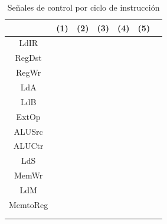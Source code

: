 \documentclass[letterpaper,11pt,notitlepage]{article}
\begin{document}
\begin{table}[H]
\begin{center}
\begin{tabular}{|c|c|c|c|c|c|c|} \hline
        &(1)&(2)&(3)&(4)&(5) \\ \hline
LdIR    &  &  &  &  &    \\ \hline
RegDst  &  &  &  &  &    \\ \hline
RegWr   &  &  &  &  &    \\ \hline
LdA     &  &  &  &  &    \\ \hline
LdB     &  &  &  &  &    \\ \hline
ExtOp   &  &  &  &  &    \\ \hline
ALUSrc  &  &  &  &  &    \\ \hline
ALUCtr  &  &  &  &  &    \\ \hline
LdS     &  &  &  &  &    \\ \hline
MemWr   &  &  &  &  &    \\ \hline
LdM     &  &  &  &  &    \\ \hline
MemtoReg&  &  &  &  &    \\ \hline
    &  &  &  &  &    \\ \hline
    &  &  &  &  &    \\ \hline

\end{tabular}
\end{center}
\caption{Señales de control por ciclo de instrucción}
\end{table}
\end{document}
